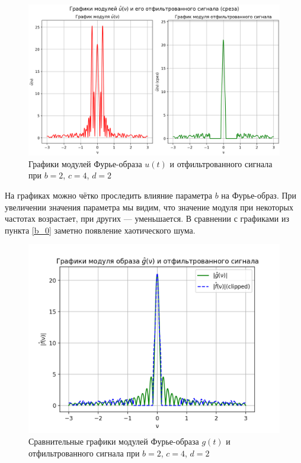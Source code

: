 \begin{figure}[ht!]
    \centering
    \includegraphics[scale=0.55]{media/1 task/specific_freq/Fourier_Image_2_4_2_-0,8:-0,153.png}
    \caption{Графики модулей Фурье-образа $u(t)$ и отфильтрованного сигнала при $b=2$,  $c=4$,  $d=2$}
    \label{fig:four_2_4_2}
\end{figure}

На графиках можно чётко проследить влияние параметра $b$ на Фурье-образ. При увеличении значения параметра мы видим, что значение модуля при некоторых частотах возрастает, при других --- уменьшается. В сравнении с графиками из пункта \ref{b_0} заметно появление хаотического шума.

\begin{figure}[ht!]
    \centering
    \includegraphics[scale=0.55]{media/1 task/specific_freq/Fourier_Image_Comparison_2_4_2_-0,8:-0,153.png}
    \caption{Сравнительные графики модулей Фурье-образа $g(t)$ и отфильтрованного сигнала при $b=2$,  $c=4$,  $d=2$}
    \label{fig:fourc_2_4_2}
\end{figure}



